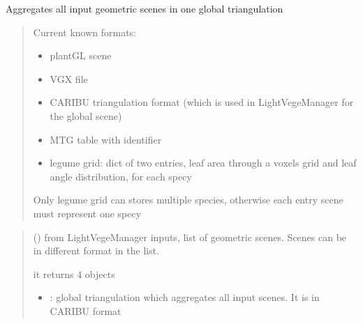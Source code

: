 \documentclass[letterpaper,10pt,english]{sphinxmanual}
\begin{document}
\begin{fulllineitems}
\label{\detokenize{reference:trianglesmesh.chain_triangulations}}
\pysigstartsignatures
{}
\pysigstopsignatures
\sphinxAtStartPar
Aggregates all input geometric scenes in one global triangulation
\begin{quote}

\sphinxAtStartPar
Current known formats:
\begin{itemize}
\item {} 
\sphinxAtStartPar
plantGL scene

\item {} 
\sphinxAtStartPar
VGX file

\item {} 
\sphinxAtStartPar
CARIBU triangulation format (which is used in LightVegeManager for the global scene)

\item {} 
\sphinxAtStartPar
MTG table with  identifier

\item {} 
\sphinxAtStartPar
l\sphinxhyphen{}egume grid: dict of two entries, leaf area through a voxels grid and leaf angle distribution, for each specy

\end{itemize}

\sphinxAtStartPar
Only l\sphinxhyphen{}egume grid can stores multiple species, otherwise each entry scene must represent one specy
\end{quote}
\begin{quote}\begin{description}
\sphinxAtStartPar
{} () \textendash{}  from LightVegeManager inputs, list of geometric scenes. Scenes can be in different format in the list.

\sphinxAtStartPar

\sphinxAtStartPar
it returns 4 objects
\begin{itemize}
\item {} 
\sphinxAtStartPar
{}: global triangulation which aggregates all input scenes. It is in CARIBU format


\end{itemize}
\end{description}
\end{quote}
\end{fulllineitems}
\end{document}

